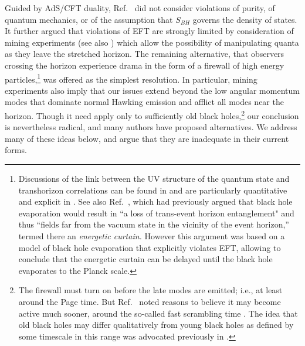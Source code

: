 \documentclass[12pt]{article}
\begin{document}
Guided by AdS/CFT duality, Ref.~\cite{Almheiri:2012rt} did not consider violations of purity, of quantum mechanics, or of the assumption that $S_{BH}$ governs the density of states.  It further argued that violations of EFT are strongly limited by consideration of mining experiments (see also \cite{Unruh:1982ic,Brown:2012un}) which allow the possibility of manipulating quanta as they leave the stretched horizon.
The remaining alternative, {that observers crossing the horizon experience drama in the form of a firewall} of high energy particles,\footnote{Discussions of the link between the UV structure of the quantum state and transhorizon correlations can be found in \cite{Haag:1984xa,'tHooft:1984re,Bombelli:1986rw,Sorkin:1986zj,Fredenhagen:1989kr,Srednicki:1993im,Jacobson:2003vx,Giddings:2006sj} and are particularly {quantitative and} explicit in \cite{Giddings:2011ks}.
See also Ref.~\cite{Braunstein:2009my}, which had previously argued that black hole evaporation would result in ``a loss of trans-event horizon entanglement" and thus ``fields far from the vacuum state in the vicinity of the event horizon,'' termed there an {\it energetic curtain.} However this argument was based on a model of black hole evaporation that explicitly violates EFT, allowing \cite{Braunstein:2009my} to conclude that the energetic curtain can be delayed until the black hole evaporates to the Planck scale.}  was offered as the simplest resolution.  In particular, mining experiments also imply that our issues extend beyond the low angular momentum modes that dominate normal Hawking emission and afflict all modes near the horizon. {Though it need apply only to sufficiently old black holes,\footnote{{The firewall must turn on before the late modes are emitted; i.e., at least around the Page time.  But Ref.~\cite{Almheiri:2012rt} noted reasons to believe it may become active much sooner, around the so-called fast scrambling time \cite{Hayden:2007cs,Sekino:2008he}.  The idea that old black holes may differ qualitatively from young black holes as defined by some timescale in this range was advocated  previously in \cite{Mathur:2008kg,Braunstein:2009my,Giddings:2011ks}.}} our conclusion is nevertheless radical,} and many authors have proposed alternatives.  We address many of these ideas below, and argue that {they are inadequate} in their current forms.
\end{document}
